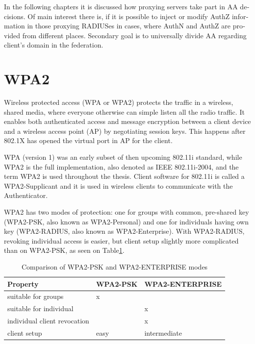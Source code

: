 \documentclass[12pt,a4paper,english]{tutthesis}
\begin{document}
\begin{otherlanguage}{english}
In the following chapters it is discussed how proxying servers take 
part in AA decisions. Of main interest there is, if it is possible 
to inject or modify AuthZ information in those proxying RADIUSes in
cases, where AuthN and AuthZ are provided from different
 places\cite{rfc2607}. Secondary goal is to universally divide AA regarding 
client's domain in the federation.




\section{WPA2}
\label{sec-2-3}

Wireless protected access (WPA or WPA2) protects the traffic in a wireless,
shared media, where everyone otherwise can simple listen all the radio traffic.
It enables both authenticated access and message
encryption between a client device and  a wireless access point (AP)
by negotiating session keys. This happens 
after 802.1X has opened the virtual port in AP for the client.

WPA (version 1)  was an early subset of then upcoming 802.11i standard,
while WPA2 is the full implementation, also denoted as IEEE
802.11i-2004, and the term WPA2 is used throughout the thesis.
Client software for 802.11i is called a WPA2-Supplicant and it is used
in wireless clients to communicate with the Authenticator. 

WPA2 has two modes of protection: one for groups with common, pre-shared
key (WPA2-PSK, also known as WPA2-Personal) and one for individuals
having own key (WPA2-RADIUS, also known as  WPA2-Enterprise).  With WPA2-RADIUS, revoking
individual access is easier, but client setup slightly more
complicated than on WPA2-PSK, as seen on Table\ref{psk-enterprise}.

\begin{table}[htb]
\caption{\label{psk-enterprise}Comparison of WPA2-PSK and WPA2-ENTERPRISE modes}
\centering
\begin{tabular}{l|l|l}
Property & WPA2-PSK & WPA2-ENTERPRISE\\
\hline
suitable for groups & x & \\
suitable for individual &  & x\\
individual client revocation &  & x\\
client setup & easy & intermediate\\
\hline
\end{tabular}
\end{table}



\end{otherlanguage}
\end{document}
